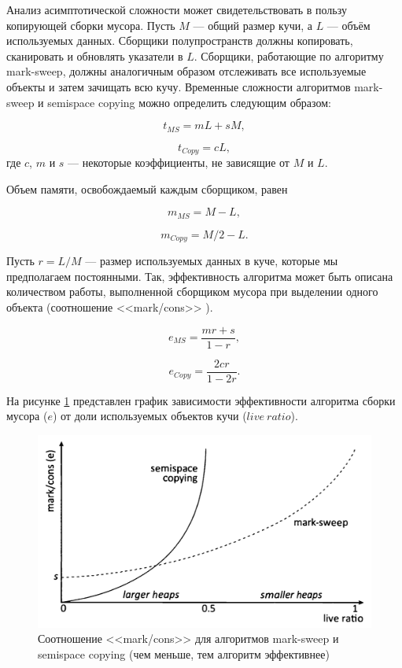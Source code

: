 Анализ асимптотической сложности может свидетельствовать в пользу копирующей сборки мусора. Пусть $M$ --- общий размер кучи, а $L$ --- объём используемых данных. Сборщики полупространств должны копировать, сканировать и обновлять указатели в $L$. Сборщики, работающие по алгоритму mark-sweep, должны аналогичным образом отслеживать все используемые объекты и затем зачищать всю кучу. Временные сложности алгоритмов mark-sweep и semispace copying можно определить следующим образом: \cite{handbook}

\begin{equation}
	t_{MS} = mL + sM,
\end{equation}

\begin{equation}
	t_{Copy} = cL,
\end{equation}
где $c$, $m$ и $s$ --- некоторые коэффициенты, не зависящие от $M$ и $L$.

Объем памяти, освобождаемый каждым сборщиком, равен

\begin{equation}
	m_{MS} = M - L,
\end{equation}

\begin{equation}
	m_{Copy} = M/2 - L.
\end{equation}

Пусть $r = L/M$ --- размер используемых данных в куче, которые мы предполагаем постоянными. Так, эффективность алгоритма может быть описана количеством работы, выполненной сборщиком мусора при выделении одного объекта (соотношение <<mark/cons>> \cite{handbook}).

\begin{equation}
	e_{MS} = \frac{mr + s}{1 - r},
\end{equation}

\begin{equation}
	e_{Copy} = \frac{2cr}{1 - 2r}.
\end{equation}

На рисунке \ref{fig:complexity} представлен график зависимости эффективности алгоритма сборки мусора ($e$) от доли используемых объектов кучи ($live~ratio$). \cite{handbook}

\begin{figure}[H]
	\centering
	\includegraphics[width=\textwidth]{assets/complexity.png}
	\caption{Соотношение <<mark/cons>> для алгоритмов mark-sweep и semispace copying (чем меньше, тем алгоритм эффективнее)}
	\label{fig:complexity}
\end{figure}

